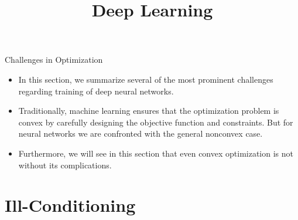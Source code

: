 




\newcommand{\titlefigure}{figure/difficult_vs_easy_intro.png}
\newcommand{\learninggoals}{
  \item Ill-Conditioning
  \item Local Minima
  \item Saddle Points
  \item Cliffs and Exploding Gradients
}

\title{Deep Learning}
\date{}




\begin{frame}{Challenges in Optimization}
 \begin{itemize}
   \item In this section, we summarize several of the most prominent challenges regarding training of deep neural networks.
   \item Traditionally, machine learning ensures that the optimization problem is convex by carefully designing
the objective function and constraints. But for neural networks we are confronted with the general nonconvex case. 
   \item Furthermore, we will see in this section that even convex optimization is not without its complications.
 \end{itemize}
\end{frame}

\section{Ill-Conditioning}

